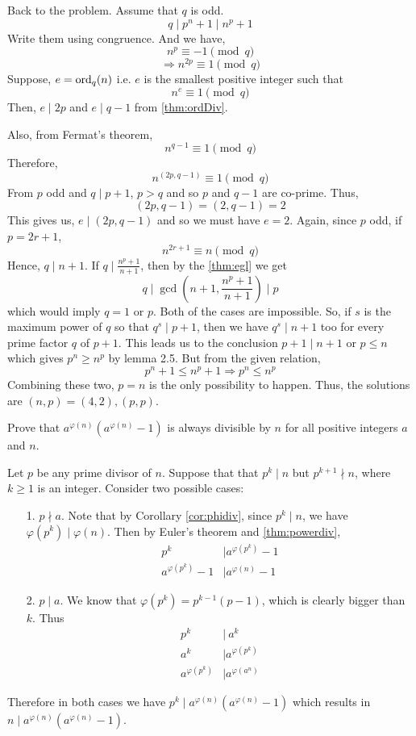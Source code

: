 \documentclass[problems.tex]{subfile}
\begin{document}
\begin{solution}
		Back to the problem.
		Assume that $q$ is odd. \[q\mid p^n+1\mid n^p+1\]
		Write them using congruence. And we have, \[n^p\equiv-1\pmod q\]
		\[\Rightarrow n^{2p}\equiv1\pmod q\]
		Suppose, $e=\operatorname{ord}_q(n)$ i.e. $e$ is the smallest positive integer such that \[n^e\equiv1\pmod q\]
		Then, $e\mid 2p$ and $e\mid q-1$ from \autoref{thm:ordDiv}.

		Also, from Fermat's theorem, \[n^{q-1}\equiv1\pmod q\]
		Therefore, \[n^{(2p,q-1)}\equiv1\pmod q\]
		From $p$ odd and $q\mid p+1$, $p>q$ and so $p$ and $q-1$ are co-prime. Thus, \[(2p,q-1)=(2,q-1)=2\]
		This gives us, $e\mid (2p,q-1)$ and so we must have $e=2$. Again, since $p$ odd, if $p=2r+1$, \[n^{2r+1}\equiv n\pmod q\]
		Hence, $q\mid n+1$. If $q\mid \frac{n^p+1}{n+1}$, then by the \autoref{thm:egl} we get \[q\mid \gcd\left(n+1,\frac{n^p+1}{n+1}\right)\mid p\]
		which would imply $q=1$ or $p$. Both of the cases are impossible. So, if $s$ is the maximum power of $q$ so that $q^s\mid p+1$, then we have $q^s\mid n+1$ too for every prime factor $q$ of $p+1$. This leads us to the conclusion $p+1\mid n+1$ or $p\le n$ which gives $p^n\ge n^p$ by lemma 2.5. But from the given relation, \[p^n+1\le n^p+1\Rightarrow p^n\le n^p\]
		Combining these two, $p=n$ is the only possibility to happen. Thus, the solutions are $(n, p)=(4,2),(p, p)$.
	\end{solution}

	\begin{problem}
		Prove that $a^{\varphi(n)}(a^{\varphi(n)}-1)$ is always divisible by $n$ for all positive integers $a$ and $n$.
	\end{problem}

	\begin{solution}
		Let $p$ be any prime divisor of $n$. Suppose that that $p^k \mid  n$ but $p^{k+1} \nmid n$, where $k\geq 1$ is an integer. Consider two possible cases:
		\begin{itemize}
			\item[1.] $p \nmid a$.  Note that by Corollary \eqref{cor:phidiv}, since $p^k \mid  n$, we have $\varphi(p^k) \mid ‌\varphi(n)$. Then by Euler's theorem and \autoref{thm:powerdiv},
				\begin{align*}
					p^k
						& \mid a^{\varphi(p^k)} -1\\
					a^{\varphi(p^k)} -1
						& \mid a^{\varphi(n)} -1
				\end{align*}
			\item[2.] 	$p\mid a$. We know that $\varphi(p^k)=p^{k-1}(p-1)$, which is clearly bigger than $k$. Thus
				\begin{align*}
					p^k
						& \mid  \ a^k \\
					a^{k}
						& \mid a^{\varphi(p^k)}\\
					a^{\varphi(p^k)}
						& \mid a^{\varphi(a^n)}
				\end{align*}
		\end{itemize}
		\noindent Therefore in both cases we have $p^k \mid  a^{\varphi(n)}(a^{\varphi(n)}-1)$ which results in $n\mid a^{\varphi(n)}(a^{\varphi(n)}-1)$.
	\end{solution}
\end{document}
